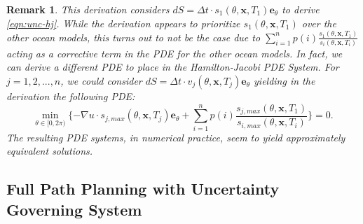 \documentclass[pdflatex,sn-mathphys-num]{sn-jnl}%
\def \bx{{\mathbf {x}}}
\def \be{{\mathbf {e}}}
\theoremstyle{thmstyleone}%
\theoremstyle{thmstyletwo}%
\newtheorem{remark}{Remark}%
\theoremstyle{thmstylethree}%
\begin{document}
\begin{remark}

    This derivation considers $dS=\Delta t \cdot s_1(\theta,\bx,T_1)\be_\theta$ to derive \eqref{eqn:unc-hj}.  While the derivation appears to prioritize $s_1(\theta,\bx,T_1)$ over the other ocean models, this turns out to not be the case due to $\sum_{i=1}^{n} p(i) \frac{s_1 (\theta, \bx, T_1)}{s_i (\theta, \bx, T_i)}$ acting as a corrective term in the PDE for the other ocean models. 
    In fact, we can derive a different PDE to place in the Hamilton-Jacobi PDE System.  For $j=1,2,...,n$, we could consider $dS=\Delta t \cdot v_j(\theta,\bx,T_j)\be_\theta$ yielding in the derivation the following PDE:
    \begin{equation*}
        \min_{\theta \in  [0, 2\pi)} \{ -\nabla u \cdot s_{j,max} (\theta, \bx, T_j) \be_\theta + \sum_{i=1}^{n} p(i) \frac{s_{j,max} (\theta, \bx, T_1)}{s_{i,max} (\theta, \bx, T_i)} \} = 0.
    \end{equation*}
    The resulting PDE systems, in numerical practice, seem to yield approximately equivalent solutions.  
\end{remark}


\subsection{Full Path Planning with Uncertainty Governing System}
\end{document}
